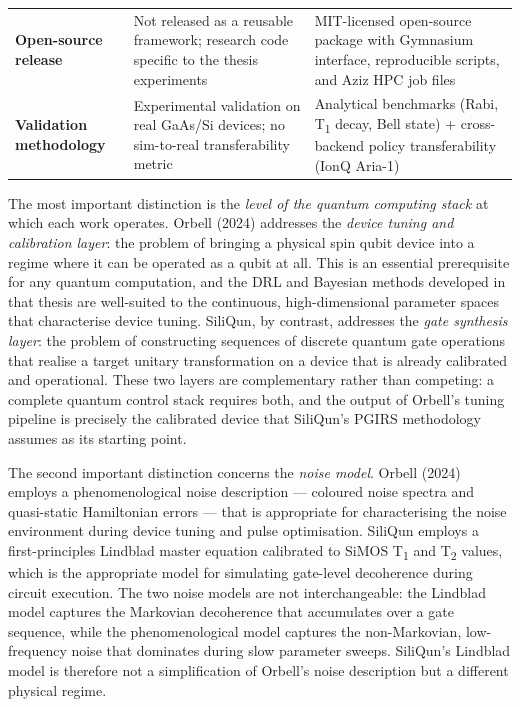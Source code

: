 \begin{table}[ht]
\begin{tabular}{p{3.8cm}p{5.2cm}p{5.2cm}}
\addlinespace
\textbf{Open-source release} &
  Not released as a reusable framework; research code specific to the thesis experiments &
  MIT-licensed open-source package with Gymnasium interface, reproducible scripts, and Aziz HPC job files \\
\addlinespace
\textbf{Validation methodology} &
  Experimental validation on real GaAs/Si devices; no sim-to-real transferability metric &
  Analytical benchmarks (Rabi, T\textsubscript{1} decay, Bell state) + cross-backend policy transferability (IonQ Aria-1) \\
\bottomrule
\end{tabular}
\end{table}

The most important distinction is the \emph{level of the quantum computing
stack} at which each work operates. Orbell (2024) addresses the
\emph{device tuning and calibration layer}: the problem of bringing a
physical spin qubit device into a regime where it can be operated as a
qubit at all. This is an essential prerequisite for any quantum computation,
and the DRL and Bayesian methods developed in that thesis are well-suited
to the continuous, high-dimensional parameter spaces that characterise
device tuning. SiliQun, by contrast, addresses the \emph{gate synthesis
layer}: the problem of constructing sequences of discrete quantum gate
operations that realise a target unitary transformation on a device that is
already calibrated and operational. These two layers are complementary
rather than competing: a complete quantum control stack requires both, and
the output of Orbell's tuning pipeline is precisely the calibrated device
that SiliQun's PGIRS methodology assumes as its starting point.

The second important distinction concerns the \emph{noise model}. Orbell
(2024) employs a phenomenological noise description — coloured noise
spectra and quasi-static Hamiltonian errors — that is appropriate for
characterising the noise environment during device tuning and pulse
optimisation. SiliQun employs a first-principles Lindblad master equation
calibrated to SiMOS T\textsubscript{1} and T\textsubscript{2} values,
which is the appropriate model for simulating gate-level decoherence during
circuit execution. The two noise models are not interchangeable: the
Lindblad model captures the Markovian decoherence that accumulates over a
gate sequence, while the phenomenological model captures the
non-Markovian, low-frequency noise that dominates during slow parameter
sweeps. SiliQun's Lindblad model is therefore not a simplification of
Orbell's noise description but a different physical regime.

